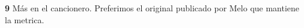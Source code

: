 \noindent \textbf{9} Más en el cancionero. Preferimos el original publicado por Melo que mantiene la metrica.

